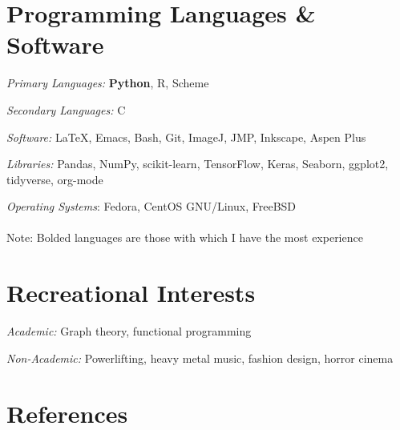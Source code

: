 \documentclass[letterpaper]{article}
\renewenvironment{itemize}{
  \begin{list}{}{
    \setlength{\leftmargin}{1.5em}
  }
}{
  \end{list}
}
\begin{document}

\section*{\textbf{Programming Languages \& Software}}
\begin{itemize}
    \item \textit{Primary Languages:} \textbf{Python}, R, Scheme
    \item \textit{Secondary Languages:} C
    \item \textit{Software:} \LaTeX, Emacs, Bash, Git, ImageJ, JMP, Inkscape, Aspen Plus
    \item \textit{Libraries:} Pandas, NumPy, scikit-learn, TensorFlow, Keras, Seaborn, ggplot2, tidyverse, org-mode
    \item \textit{Operating Systems}: Fedora, CentOS GNU/Linux, FreeBSD\\\\
    \tiny{Note: Bolded languages are those with which I have the most experience}
\end{itemize}

\section*{\textbf{Recreational Interests}}
\begin{itemize}
\item \textit{Academic:} Graph theory, functional programming
\item \textit{Non-Academic:} Powerlifting, heavy metal music, fashion design, horror cinema
\end{itemize}

\section*{\textbf{References}}
\end{document}

